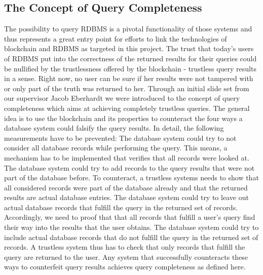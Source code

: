 \subsection{The Concept of Query Completeness} \label{sssec:queryCompleteness}
The possibility to query RDBMS is a pivotal functionality of those systems and thus represents a great entry point for efforts to link the technologies of blockchain and RDBMS as targeted in this project. The trust that today’s users of RDBMS put into the correctness of the returned results for their queries could be nullified by the trustlessness offered by the blockchain - trustless query results in a sense. Right now, no user can be sure if her results were not tampered with or only part of the truth was returned to her.
Through an initial slide set from our supervisor Jacob Eberhardt we were introduced to the concept of query completeness which aims at achieving completely trustless queries. The general idea is to use the blockchain and its properties to counteract the four ways a database system could falsify the query results. In detail, the following measurements have to be prevented:
The database system could try to not consider all database records while performing the query. This means, a mechanism has to be implemented that verifies that all records were looked at.
The database system could try to add records to the query results that were not part of the database before. To counteract, a trustless systems needs to show that all considered records were part of the database already and that the returned results are actual database entries.
The database system could try to leave out actual database records that fulfill the query in the returned set of records. Accordingly, we need to proof that that all records that fulfill a user’s query find their way into the results that the user obtains.
The database system could try to include actual database records that do not fulfill the query in the returned set of records. A trustless system thus has to check that only records that fulfill the query are returned to the user.
Any system that successfully counteracts these ways to counterfeit query results achieves query completeness as defined here.

